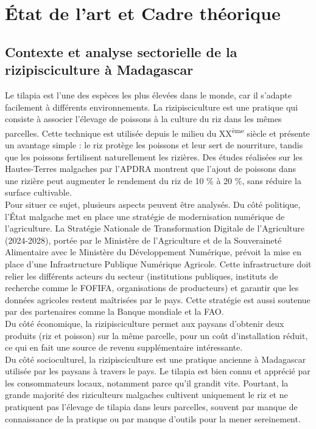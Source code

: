 \documentclass[a4paper,12pt, oneside]{article}
\begin{document}
\section{État de l'art et Cadre théorique}
\subsection{Contexte et analyse sectorielle de la rizipisciculture à Madagascar}
Le tilapia est l'une des espèces les plus élevées dans le monde, car il s'adapte facilement à différents environnements. La rizipisciculture est une pratique qui consiste à associer l'élevage de poissons à la culture du riz dans les mêmes parcelles. Cette technique est utilisée depuis le milieu du XX\textsuperscript{ème} siècle et présente un avantage simple : le riz protège les poissons et leur sert de nourriture, tandis que les poissons fertilisent naturellement les rizières. Des études réalisées sur les Hautes-Terres malgaches par l'APDRA montrent que l'ajout de poissons dans une rizière peut augmenter le rendement du riz de 10 \% à 20 \%, sans réduire la surface cultivable.\\

Pour situer ce sujet, plusieurs aspects peuvent être analysés. Du côté politique, l'État malgache met en place une stratégie de modernisation numérique de l'agriculture. La Stratégie Nationale de Transformation Digitale de l'Agriculture (2024-2028), portée par le Ministère de l'Agriculture et de la Souveraineté Alimentaire avec le Ministère du Développement Numérique, prévoit la mise en place d'une Infrastructure Publique Numérique Agricole. Cette infrastructure doit relier les différents acteurs du secteur (institutions publiques, instituts de recherche comme le FOFIFA, organisations de producteurs) et garantir que les données agricoles restent maîtrisées par le pays. Cette stratégie est aussi soutenue par des partenaires comme la Banque mondiale et la FAO.\\

Du côté économique, la rizipisciculture permet aux paysans d'obtenir deux produits (riz et poisson) sur la même parcelle, pour un coût d'installation réduit, ce qui en fait une source de revenu supplémentaire intéressante.\\

Du côté socioculturel, la rizipisciculture est une pratique ancienne à Madagascar utilisée par les paysans à travers le pays. Le tilapia est bien connu et apprécié par les consommateurs locaux, notamment parce qu'il grandit vite. Pourtant, la grande majorité des riziculteurs malgaches cultivent uniquement le riz et ne pratiquent pas l'élevage de tilapia dans leurs parcelles, souvent par manque de connaissance de la pratique ou par manque d'outils pour la mener sereinement.\\
\end{document}

